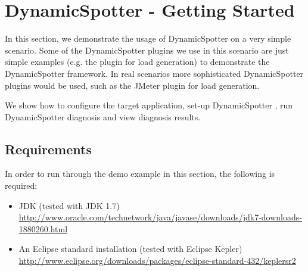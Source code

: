 \documentclass{report}
\newcommand{\DS}{DynamicSpotter }
\newcommand{\link}[1]{\textcolor[rgb]{0.0,0.0,1.0}{\href{#1}{#1}}}
\begin{document}
\section{DynamicSpotter - Getting Started}
In this section, we demonstrate the usage of \DS on a very simple scenario. Some of the \DS plugins we use in this
scenario are just simple examples (e.g. the plugin for load generation) to demonstrate the \DS framework. In real
scenarios more sophisticated \DS plugins would be used, such as the JMeter plugin for load generation.

We show how to configure the target application, set-up \DS, run \DS diagnosis and view diagnosis
results.


\subsection{Requirements}
In order to run through the demo example in this section, the following is required:
\begin{itemize}
  \item JDK (tested with JDK 1.7)
  \\ \link{http://www.oracle.com/technetwork/java/javase/downloads/jdk7-downloads-1880260.html}
  \item An Eclipse standard installation (tested with Eclipse Kepler) 
  \\ \link{http://www.eclipse.org/downloads/packages/eclipse-standard-432/keplersr2}
\end{itemize}
\end{document}
